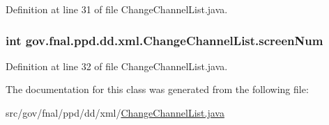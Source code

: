 Definition at line 31 of file Change\-Channel\-List.\-java.

\hypertarget{classgov_1_1fnal_1_1ppd_1_1dd_1_1xml_1_1ChangeChannelList_a3fa9894ed010b7aa7d6b3f007b20229a}{
\subsubsection[{screen\-Num}]{\setlength{\rightskip}{0pt plus 5cm}int gov.\-fnal.\-ppd.\-dd.\-xml.\-Change\-Channel\-List.\-screen\-Num\hspace{0.3cm}{\ttfamily [protected]}}}\label{classgov_1_1fnal_1_1ppd_1_1dd_1_1xml_1_1ChangeChannelList_a3fa9894ed010b7aa7d6b3f007b20229a}


Definition at line 32 of file Change\-Channel\-List.\-java.



The documentation for this class was generated from the following file\-:\begin{DoxyCompactItemize}
\item 
src/gov/fnal/ppd/dd/xml/\hyperlink{ChangeChannelList_8java}{Change\-Channel\-List.\-java}\end{DoxyCompactItemize}
